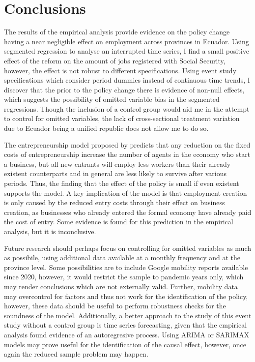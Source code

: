 \documentclass[11pt,a4paper]{article}\usepackage[]{graphicx}\usepackage[]{xcolor}
\begin{document}
\section{Conclusions}

The results of the empirical analysis provide evidence on the policy change having a near negligible effect on employment across provinces in Ecuador. Using segmented regression to analyse an interrupted time series, I find a small positive effect of the reform on the amount of jobs registered with Social Security, however, the effect is not robust to different specifications. Using event study specifications which consider period dummies instead of continuous time trends, I discover that the prior to the policy change there is evidence of non-null effects, which suggests the possibility of omitted variable bias in the segmented regressions. Though the inclusion of a control group would aid me in the attempt to control for omitted variables, the lack of cross-sectional treatment variation due to Ecuador being a unified republic does not allow me to do so. 

The entrepreneurship model proposed by \textcite{Branstetter.2014} predicts that any reduction on the fixed costs of entrepreneurship increase the number of agents in the economy who start a business, but all new entrants will employ less workers than their already existent counterparts and in general are less likely to survive after various periods. Thus, the finding that the effect of the policy is small if even existent supports the model. A key implication of the model is that employment creation is only caused by the reduced entry costs through their effect on business creation, as businesses who already entered the formal economy have already paid the cost of entry. Some evidence is found for this prediction in the empirical analysis, but it is inconclusive. 

Future research should perhaps focus on controlling for omitted variables as much as possibile, using additional data available at a monthly frequency and at the province level. Some possibilities are to include Google mobility reports available since 2020, however, it would restrict the sample to pandemic years only, which may render conclusions which are not externally valid. Further, mobility data may overcontrol for factors and thus not work for the identification of the policy, however, these data should be useful to perform robustness checks for the soundness of the model. Additionally, a better approach to the study of this event study without a control group is time series forecasting, given that the empirical analysis found evidence of an autoregresive process. Using ARIMA or SARIMAX models may prove useful for the identification of the causal effect, however, once again the reduced sample problem may happen. 
\end{document}
